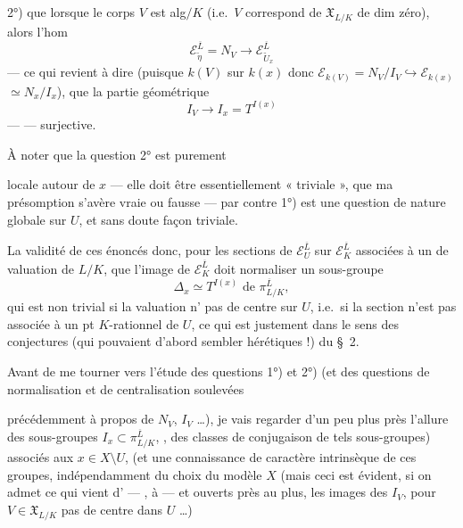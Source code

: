 \documentclass[11pt,a4paper]{article}
\begin{document}
2°) que  lorsque le corps  \ill{} $V$ est alg$/K$ (i.e.\ $V$ correspond  de $\mathfrak{X}_{L/K}$ de dim zéro), alors l'hom
\[
  \mathcal{E}_{\widetilde{\eta}}^{\overline{L}} = N_V \to \mathcal{E}_{\widetilde{U}_x}^{\overline{L}}
\]
    — ce qui revient à dire (puisque $k(V)$   sur $k(x)$ donc $\mathcal{E}_{k(V)} = N_V / I_V \hookrightarrow \mathcal{E}_{k(x)}$  $\simeq N_x / I_x$), que la partie géométrique
\[
  I_V \longrightarrow I_x = T^{I(x)}
\]
 —  —  surjective. 

À noter que la question 2° est purement


locale autour de $x$ — elle doit être essentiellement « triviale », que ma présomption s'avère vraie ou fausse — par contre 1°) est une question de nature globale sur $U$, et sans doute   façon triviale.

 La validité de ces énoncés   donc, pour les sections de $\mathcal{E}_U^{\overline{L}}$ sur $\mathcal{E}_K^{\overline{L}}$ associées à un \struck{\ill{}}  de valuation de $L/K$,  que l'image de $\mathcal{E}_K^{\overline{L}}$ doit normaliser un  sous-groupe
\[
  \Delta_x \simeq T^{I(x)} \text{ de } \pi_{L/K}^{\overline{L}},
\]
qui est non trivial si la valuation n' pas de centre sur $U$, i.e.\ si la section n'est pas associée à un pt $K$-rationnel de $U$, ce qui est justement dans le sens des conjectures (qui pouvaient d'abord sembler hérétiques !) du §~2.

Avant de me tourner vers l'étude des questions 1°) et 2°) (et  des questions de normalisation et de centralisation soulevées

précédemment à propos de $N_V$, $I_V$ …), je vais regarder d'un peu plus près l'allure des sous-groupes $I_x \subset \pi_{L/K}^{\overline{L}}$,  , des classes de \add{$\pi$-}conjugaison de tels sous-groupes) associés aux $x \in X \setminus U$,  (et une connaissance de caractère intrinsèque de ces groupes, indépendamment du choix du modèle $X$ (mais ceci est évident, si on admet ce qui vient d'  — , à  — et   ouverts près  au plus, les images des $I_V$, pour $V \in \mathfrak{X}_{L/K}$ \struck{\ill{}}  pas de centre dans  $U$ …)
\end{document}
